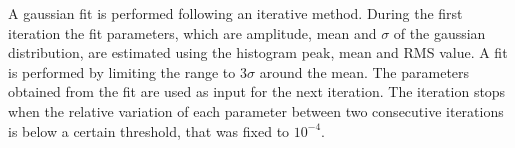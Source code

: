 \documentclass[a4paper,twoside,12pt]{book}
\begin{document}
\begin{appendices}
A gaussian fit is performed following an iterative method. During the first
iteration the fit parameters, which are amplitude, mean and $\sigma$ of the gaussian
distribution, are estimated using 
the histogram peak, mean and RMS value. A fit is performed by limiting the range
to 3$\sigma$ around the mean. The parameters obtained from the fit are used as 
input for the next iteration. The iteration stops when the relative variation of each parameter between 
two consecutive iterations  is below a certain threshold, that was
fixed to $10^{-4}$.




\clearpage
\end{appendices}

\baselineskip 25pt
\baselineskip 5pt
\baselineskip 16pt

\appendix





\end{document}
